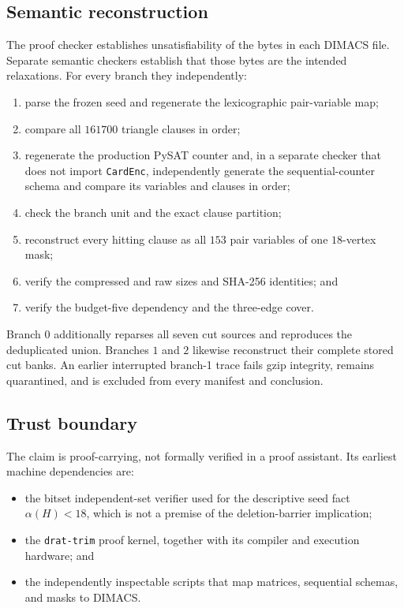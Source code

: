 \subsection{Semantic reconstruction}

The proof checker establishes unsatisfiability of the bytes in each DIMACS
file.  Separate semantic checkers establish that those bytes are the intended
relaxations.  For every branch they independently:

\begin{enumerate}[label=(\arabic*)]
\item parse the frozen seed and regenerate the lexicographic pair-variable
  map;
\item compare all \(161700\) triangle clauses in order;
\item regenerate the production PySAT counter and, in a separate checker that
  does not import \texttt{CardEnc}, independently generate the
  sequential-counter schema and compare its variables and clauses in order;
\item check the branch unit and the exact clause partition;
\item reconstruct every hitting clause as all \(153\) pair variables of one
  \(18\)-vertex mask;
\item verify the compressed and raw sizes and SHA-256 identities; and
\item verify the budget-five dependency and the three-edge cover.
\end{enumerate}

Branch \(0\) additionally reparses all seven cut sources and reproduces the
deduplicated union.  Branches \(1\) and \(2\) likewise reconstruct their
complete stored cut banks.  An earlier interrupted branch-1 trace fails gzip
integrity, remains quarantined, and is excluded from every manifest and
conclusion.

\subsection{Trust boundary}

The claim is proof-carrying, not formally verified in a proof assistant.  Its
earliest machine dependencies are:

\begin{itemize}
\item the bitset independent-set verifier used for the descriptive seed fact
  \(\alpha(H)<18\), which is not a premise of the deletion-barrier implication;
\item the \texttt{drat-trim} proof kernel, together with its compiler and
  execution hardware; and
\item the independently inspectable scripts that map matrices, sequential
  schemas, and masks to DIMACS.
\end{itemize}


